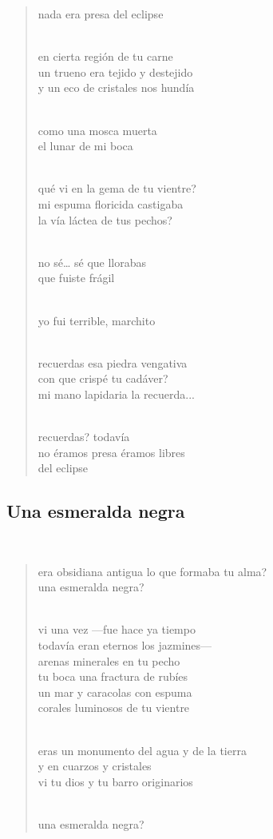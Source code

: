 \documentclass[a4paper, 12pt]{article}
\begin{document}
\begin{verse}
nada era presa del eclipse\\
~ 

en cierta región de tu carne\\
un trueno era tejido y destejido\\
y un eco de cristales nos hundía\\
~ 

como una mosca muerta\\
el lunar de mi boca\\
~ 

qué vi en la gema de tu vientre?\\
mi espuma floricida castigaba\\
la vía láctea de tus pechos?\\
~ 

no sé… sé que llorabas\\
que fuiste frágil\\
~ 

yo fui terrible, marchito\\
~ 

recuerdas esa piedra vengativa\\
con que crispé tu cadáver?\\
mi mano lapidaria la recuerda...\\
~ 

recuerdas? todavía\\
no éramos presa éramos libres\\
del eclipse\\

\end{verse}

\pagebreak 
\subsection{Una esmeralda negra}
~

\begin{verse}
    
era obsidiana antigua lo que formaba tu alma?\\
una esmeralda negra?\\
~ 

vi una vez —fue hace ya tiempo\\
todavía eran eternos los jazmines—\\
arenas minerales en tu pecho\\
tu boca una fractura de rubíes\\
un mar y caracolas con espuma\\
corales luminosos de tu vientre\\
~ 

eras un monumento del agua y de la tierra\\
y en cuarzos y cristales\\
vi tu dios y tu barro originarios\\
~ 

una esmeralda negra?\\
\end{verse}
\end{document}

